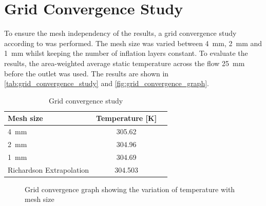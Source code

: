 \section{Grid Convergence Study}
\label{sec:grid_convergence_study}

To ensure the mesh independency of the results, a grid convergence study according to \autocite{ExaminingSpatialGrid} was performed.
The mesh size was varied between \qty{4}{\milli\meter}, \qty{2}{\milli\meter} and \qty{1}{\milli\meter} whilst keeping the number of inflation layers constant. To evaluate the results, the area-weighted average static temperature across the flow \qty{25}{\milli\meter} before the outlet was used.
The results are shown in \autoref{tab:grid_convergence_study} and \autoref{fig:grid_convergence_graph}.

\begin{table}[htbp]
    \centering
    \caption{Grid convergence study}
    \label{tab:grid_convergence_study}
    \begin{tabular}{lcc}
        \toprule
        Mesh size & Temperature [\unit{\kelvin}] \\
        \midrule
        \qty{4}{\milli\meter} & 305.62 \\
        \qty{2}{\milli\meter} & 304.96 \\
        \qty{1}{\milli\meter} & 304.69 \\
        Richardson Extrapolation & 304.503 \\
        \bottomrule
    \end{tabular}
\end{table}

\begin{figure}
    \centering
    \caption{Grid convergence graph showing the variation of temperature with mesh size}
    \label{fig:grid_convergence_graph}
\end{figure}

